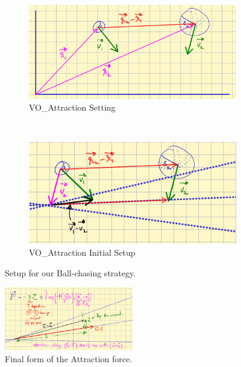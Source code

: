 \documentclass[a4paper,12pt]{article}
\begin{document}
\begin{figure}[!hptb]
  \centering
  \begin{subfigure}[b]{0.45\textwidth}
    \centering
    \includegraphics[width=\textwidth]{./figures/soccer_VO_attraction_setup.png}
    \caption{VO\_Attraction Setting}
    \label{fig:soccer_VO_attraction_setting}
  \end{subfigure}
  ~
  \begin{subfigure}[b]{0.45\textwidth}
    \centering
    \includegraphics[width=\textwidth]{./figures/soccer_VO_attraction_setup_2.png}
    \caption{VO\_Attraction Initial Setup}
    \label{fig:soccer_VO_attraction_initial_setup}
  \end{subfigure}
  \caption{Setup for our Ball-chasing strategy.}
\end{figure}

\begin{figure}[!hptb]
  \centering
  \includegraphics[width=0.5\textwidth]{./figures/soccer_VO_attraction_calculation.png}
  \caption{Final form of the Attraction force.}
  \label{fig:soccer_VO_attraction_calculation}
\end{figure}
\end{document}
